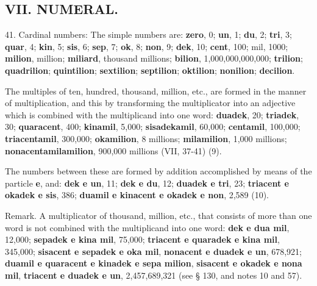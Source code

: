 \subsection*{VII. NUMERAL.}
41. Cardinal numbers: The simple numbers are: \textbf{zero}, 0; \textbf{un}, 1; \textbf{du}, 2; \textbf{tri}, 3; \textbf{quar}, 4; \textbf{kin}\footnotemark[1], 5; \textbf{sis}, 6; \textbf{sep}, 7; \textbf{ok}, 8; \textbf{non}, 9; \textbf{dek}, 10; \textbf{cent}, 100; mil, 1000; \textbf{milion}, million; \textbf{miliard}, thousand millions; \textbf{bilion}, 1,000,000,000,000; \textbf{trilion}; \textbf{quadrilion}; \textbf{quintilion}; \textbf{sextilion}; \textbf{septilion}; \textbf{oktilion}; \textbf{nonilion}; \textbf{decilion}.\footnotemark[2] 

The multiples of ten, hundred, thousand, million, etc., are formed in the manner of multiplication, and this by transforming the multiplicator into an adjective which is combined with the multiplicand into one word: \textbf{duadek}, 20; \textbf{triadek}, 30; \textbf{quaracent}, 400; \textbf{kinamil}, 5,000; \textbf{sisadekamil}, 60,000; \textbf{centamil}, 100,000; \textbf{triacentamil}, 300,000; \textbf{okamilion}, 8 millions; \textbf{milamilion}, 1,000 millions; \textbf{nonacentamilamilion}, 900,000 millions (VII, 37-41) (9). 

The numbers between these are formed by addition accomplished by means of the particle \textbf{e}, and: \textbf{dek e un}, 11; \textbf{dek e du}, 12; \textbf{duadek e tri}, 23; \textbf{triacent e okadek e sis}, 386; \textbf{duamil e kinacent e okadek e non}, 2,589 (10). 

\small Remark. A multiplicator of thousand, million, etc., that consists of more than one word is not combined with the multiplicand into one word: \textbf{dek e dua mil}, 12,000; \textbf{sepadek e kina mil}, 75,000; \textbf{triacent e quaradek e kina mil}, 345,000; \textbf{sisacent e sepadek e oka mil}, \textbf{nonacent e duadek e un}, 678,921; \textbf{duamil e quaracent e kinadek e sepa milion}, \textbf{sisacent e okadek e nona mil}, \textbf{triacent e duadek e un}, 2,457,689,321 (see § 130, and notes 10 and 57). \normalsize


